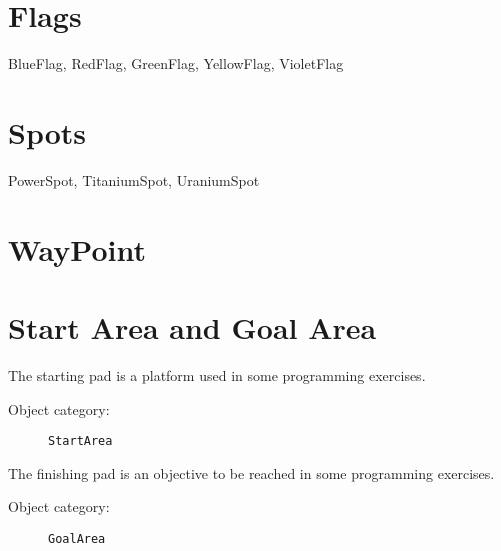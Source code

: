 \section{Flags}

BlueFlag, RedFlag, GreenFlag, YellowFlag, VioletFlag


\section{Spots}

PowerSpot, TitaniumSpot, UraniumSpot


\section{WayPoint}



\section{Start Area and Goal Area}

The starting pad is a platform used in some programming exercises.

\begin{description}
    \item[Object category:] \texttt{StartArea}
\end{description}

The finishing pad is an objective to be reached in some programming exercises.

\begin{description}
    \item[Object category:] \texttt{GoalArea}
\end{description}